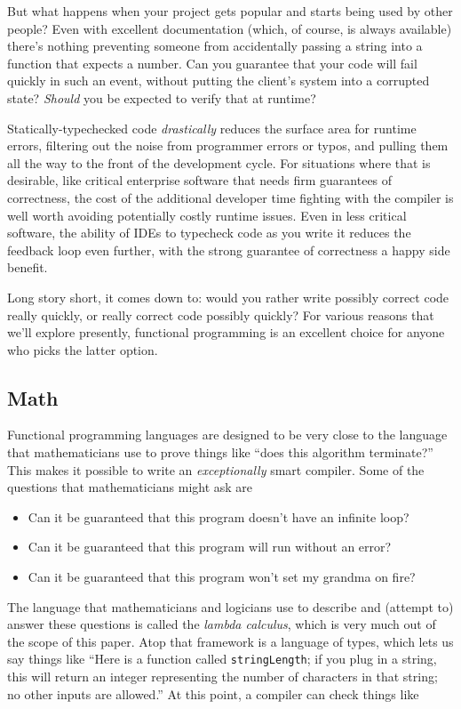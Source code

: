 \documentclass{book}
\newcommand{\mlil}[1]{\lstinline[language=pseudoml,columns=fixed]|#1|}\usepackage{caption}
\begin{document}
But what happens when your project gets popular and starts being used by other people? Even with excellent documentation (which, of course, is always available) there's nothing preventing someone from accidentally passing a string into a function that expects a number. Can you guarantee that your code will fail quickly in such an event, without putting the client's system into a corrupted state? \emph{Should} you be expected to verify that at runtime?

Statically-typechecked code \emph{drastically} reduces the surface area for runtime errors, filtering out the noise from programmer errors or typos, and pulling them all the way to the front of the development cycle. For situations where that is desirable, like critical enterprise software that needs firm guarantees of correctness, the cost of the additional developer time fighting with the compiler is well worth avoiding potentially costly runtime issues. Even in less critical software, the ability of IDEs to typecheck code as you write it reduces the feedback loop even further, with the strong guarantee of correctness a happy side benefit.

Long story short, it comes down to: would you rather write possibly correct code really quickly, or really correct code possibly quickly? For various reasons that we'll explore presently, functional programming is an excellent choice for anyone who picks the latter option.

\subsection{Math}

Functional programming languages are designed to be very close to the language that mathematicians use to prove things like ``does this algorithm terminate?'' This makes it possible to write an \emph{exceptionally} smart compiler. Some of the questions that mathematicians might ask are

\begin{itemize}
    \item Can it be guaranteed that this program doesn't have an infinite loop?
    \item Can it be guaranteed that this program will run without an error?
    \item Can it be guaranteed that this program won't set my grandma on fire?
\end{itemize}

The language that mathematicians and logicians use to describe and (attempt to) answer these questions is called the \emph{lambda calculus}, which is very much out of the scope of this paper. Atop that framework is a language of types, which lets us say things like ``Here is a function called \mlil{stringLength}; if you plug in a string, this will return an integer representing the number of characters in that string; no other inputs are allowed.'' At this point, a compiler can check things like
\end{document}
